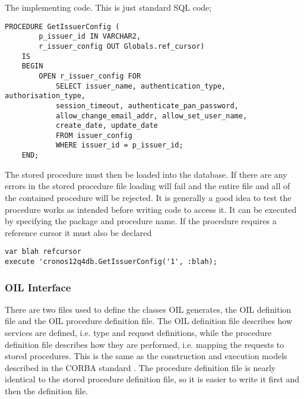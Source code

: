 \documentclass[a4paper, 11pt, titlepage]{article}
\begin{document}
The implementing code. This is just standard SQL code;
\begin{verbatim} 
PROCEDURE GetIssuerConfig ( 
        p_issuer_id IN VARCHAR2, 
        r_issuer_config OUT Globals.ref_cursor) 
    IS 
    BEGIN 
        OPEN r_issuer_config FOR 
            SELECT issuer_name, authentication_type, authorisation_type, 
            session_timeout, authenticate_pan_password, 
            allow_change_email_addr, allow_set_user_name, 
            create_date, update_date 
            FROM issuer_config 
            WHERE issuer_id = p_issuer_id; 
    END; 
\end{verbatim} 
The stored procedure must then be loaded into the database. If there are any errors in the stored procedure file loading will fail and the entire file and all of the contained procedure will be rejected. It is generally a good idea to test the procedure works as intended before writing code to access it. It can be executed by specifying the package and procedure name. If the procedure requires a reference cursor it must also be declared 
\begin{verbatim} 
var blah refcursor 
execute 'cronos12q4db.GetIssuerConfig('1', :blah); 
\end{verbatim} 
 
\subsubsection{OIL Interface} 
There are two files used to define the classes OIL generates, the OIL definition file and the OIL procedure definition file. The OIL definition file describes how services are defined, i.e. type and request definitions, while the procedure definition file describes how they are performed, i.e. mapping the requests to stored procedures. This is the same as the construction and execution models described in the CORBA standard \cite{CORBA}. The procedure definition file is nearly identical to the stored procedure definition file, so it is easier to write it first and then the definition file. 
\end{document}
